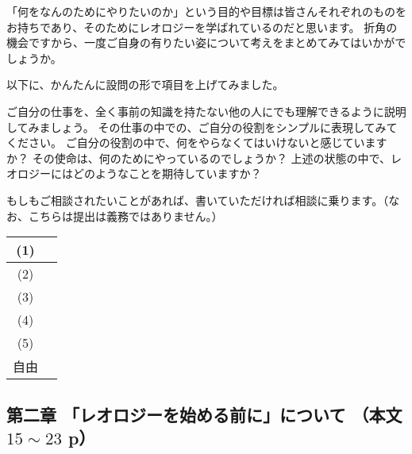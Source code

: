 \documentclass[uplatex,dvipdfmx,a4paper,11pt]{jsarticle}
\begin{document}
\clearpage
{}
\begin{qparts}
    \qpart 「何をなんのためにやりたいのか」という目的や目標は皆さんそれぞれのものをお持ちであり、そのためにレオロジーを学ばれているのだと思います。
    折角の機会ですから、一度ご自身の有りたい姿について考えをまとめてみてはいかがでしょうか。

    以下に、かんたんに設問の形で項目を上げてみました。
    \vspace{-2mm}
    \begin{qlist}
        \qitem ご自分の仕事を、全く事前の知識を持たない他の人にでも理解できるように説明してみましょう。
        \qitem その仕事の中での、ご自分の役割をシンプルに表現してみてください。
        \qitem ご自分の役割の中で、何をやらなくてはいけないと感じていますか？
        \qitem その使命は、何のためにやっているのでしょうか？
        \qitem 上述の状態の中で、レオロジーにはどのようなことを期待していますか？
    \end{qlist}
    \vspace{-2mm}
    \qpart もしもご相談されたいことがあれば、書いていただければ相談に乗ります。（なお、こちらは提出は義務ではありません。）
\end{qparts}
\begin{table}[htb]
    \renewcommand\arraystretch{4.0}
    \begin{center} 
      \begin{tabular}{|c|p{}|} \hline
        (1) & \\ \hline
        (2)  & \\ \hline
        (3) & \\ \hline
        (4)  & \\ \hline
        (5) & \\ \hline
        自由  & \\ \hline
      \end{tabular}
    \end{center}
  \end{table}

\clearpage
\subsection*{第二章 「レオロジーを始める前に」について （本文 $15\sim23$ p）}
\end{document}
